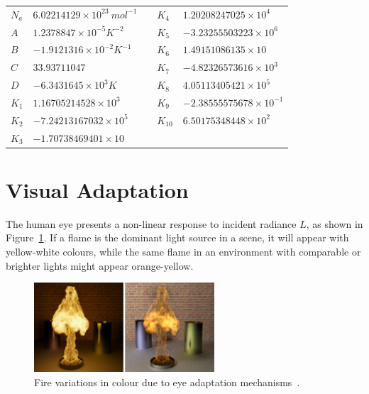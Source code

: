 \begin{table}[htbp!]
\begin{tabular}{|l|l|l|l|l|}
$N_a$ & $6.02214129 \times 10^{23}~mol^{-1}$ &  & $K_4$  & $1.20208247025 \times 10^{4}$   \\ \cline{1-2} \cline{4-5} 
$A$   & $1.2378847 \times 10^{-5} K^{-2}$    &  & $K_5$  & $-3.23255503223 \times 10^{6}$  \\ \cline{1-2} \cline{4-5} 
$B$   & $-1.9121316 \times 10^{-2} K^{-1}$   &  & $K_6$  & $1.49151086135 \times 10$       \\ \cline{1-2} \cline{4-5} 
$C$   & $33.93711047$                        &  & $K_7$  & $-4.82326573616 \times 10^{3}$  \\ \cline{1-2} \cline{4-5} 
$D$   & $-6.3431645 \times 10^3 K$           &  & $K_8$  & $4.05113405421 \times 10^{5}$   \\ \cline{1-2} \cline{4-5} 
$K_1$ & $1.16705214528 \times 10^{3}$        &  & $K_9$  & $-2.38555575678 \times 10^{-1}$ \\ \cline{1-2} \cline{4-5} 
$K_2$ & $-7.24213167032 \times 10^{5}$       &  & $K_{10}$ & $6.50175348448 \times 10^{2}$   \\ \cline{1-2} \cline{4-5} 
$K_3$ & $-1.70738469401 \times 10$           &  &        &                                 \\ \cline{1-2} \cline{4-5}
\end{tabular}
\end{table}
\renewcommand{\arraystretch}{1} %

\FloatBarrier
\section{Visual Adaptation}
\label{sec:visual_adaptation}

The human eye presents a non-linear response to incident radiance $L$, as shown in Figure~\ref{fig:pegoraro_2006_adaptation}.
If a flame is the dominant light source in a scene, it will appear with yellow-white colours, while the same flame in an environment with comparable or brighter lights might appear orange-yellow.

\begin{figure}[htbp!]
	\centering
	\includegraphics[width=0.6\textwidth]{img/pegoraro_2006_adaptation}
	\caption{Fire variations in colour due to eye adaptation mechanisms~\cite{Pegoraro:2006}.}
	\label{fig:pegoraro_2006_adaptation}
\end{figure}

